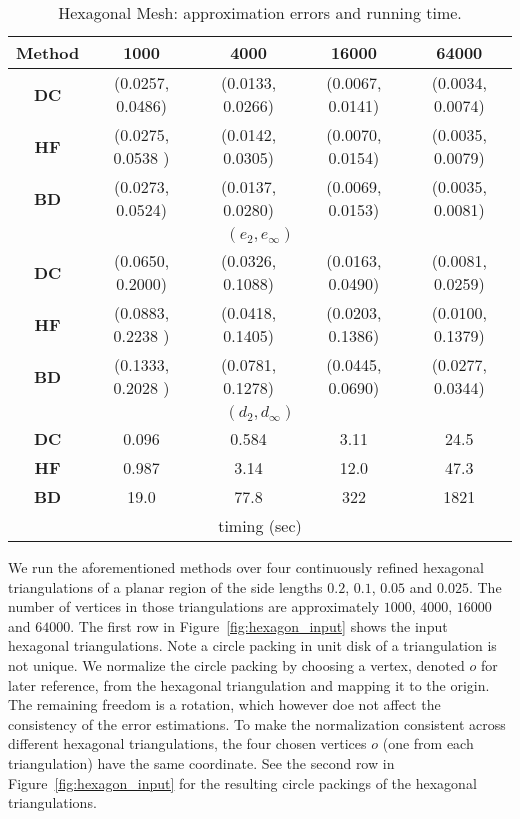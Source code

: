 \documentclass[11pt]{article}
\begin{document}
\begin{table}[!h]
\begin{center}
\begin{tabular}{| c | c | c | c | c |}
\hline
Method  & 1000 &  4000 & 16000 & 64000   \\
\hline
{\bf DC} & (0.0257, 0.0486) & (0.0133, 0.0266) & (0.0067, 0.0141) & (0.0034, 0.0074) \\
\hline
{\bf HF} & (0.0275, 0.0538 ) & (0.0142, 0.0305) & (0.0070, 0.0154) & (0.0035, 0.0079)\\
\hline
{\bf BD}& (0.0273, 0.0524) & (0.0137, 0.0280) & (0.0069, 0.0153) & (0.0035, 0.0081)\\
\hline
\multicolumn{5}{|c|}{ $(e_2, e_\infty)$} \\
\hline
{\bf DC} & (0.0650, 0.2000) & (0.0326, 0.1088) & (0.0163, 0.0490) & (0.0081, 0.0259) \\
\hline
{\bf HF} & (0.0883, 0.2238 ) & (0.0418, 0.1405) & (0.0203, 0.1386) & (0.0100, 0.1379)\\
\hline
{\bf BD}& (0.1333, 0.2028 ) & (0.0781, 0.1278) & (0.0445, 0.0690) & (0.0277, 0.0344)\\
\hline
\multicolumn{5}{|c|}{ $(d_2, d_\infty)$} \\
\hline
{\bf DC} & 0.096 & 0.584 & 3.11 & 24.5 \\
\hline
{\bf HF} &  0.987 & 3.14 & 12.0 & 47.3 \\
\hline
{\bf BD}& 19.0 & 77.8  & 322 & 1821\\
\hline
\multicolumn{5}{|c|}{ timing (sec)} \\
\hline
\end{tabular}
\end{center}
\vspace{-0.1in}
\caption{Hexagonal Mesh: approximation errors and running time.
\label{tbl:hexagon}
}
\end{table}


We run the aforementioned methods over four continuously refined hexagonal triangulations of a planar region
of the side lengths $0.2$, $0.1$, $0.05$ and $0.025$. The number of vertices in those triangulations are approximately
$1000$, $4000$, $16000$ and $64000$. The first row in Figure~\ref{fig:hexagon_input} shows the input hexagonal triangulations. 
Note a circle packing in unit disk of a triangulation is not unique. We normalize the circle 
packing by choosing a vertex, denoted $o$ for later reference, from the hexagonal triangulation and mapping it to the origin.
The remaining freedom is a rotation, which however doe not affect the consistency of the error estimations.
To make the normalization consistent across different hexagonal triangulations, the four chosen vertices $o$ 
(one from each triangulation) have the same coordinate. See the second row in Figure~\ref{fig:hexagon_input} for the
resulting circle packings of the hexagonal triangulations. 
\end{document}
